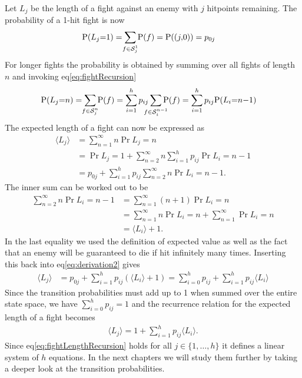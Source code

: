 Let $L_j$ be the length of a fight against an enemy with $j$ hitpoints remaining. The probability of a 1-hit fight is now
\begin{align}\label{eq:probabilityRecursion1hit}
    \Pr{L_j = 1} &= \sum_{\mathclap{f \in \mathcal{S}_j^1}}\Pr{f}
            = \Pr{(j,0}) = p_{0j}
\end{align}
For longer fights the probability is obtained by summing over all fights of length $n$ and invoking eq\ref{eq:fightRecursion}
\begin{align}\label{eq:probabilityRecursion}
    \Pr{L_j = n} &= \sum_{\mathclap{f \in \mathcal{S}_j^n}}\Pr{f}
            = \sum_{i=1}^h p_{ij} \sum_{\mathclap{f \in \mathcal{S}_i^{n-1}}}\Pr{f}
            = \sum_{i=1}^h p_{ij} \Pr{L_i = n-1}
\end{align}
The expected length of a fight can now be expressed as
\begin{align}
	\langle L_j \rangle &= \sum_{n=1}^{\infty}n\Pr{L_j=n}\nonumber\\
       &= \Pr{L_j=1} + \sum_{n=2}^{\infty}n\sum_{i=1}^h p_{ij} \Pr{L_i=n-1}\nonumber\\
       &= p_{0j} + \sum_{i=1}^h p_{ij} \sum_{n=2}^{\infty}n\Pr{L_i=n-1}.\label{eq:derivation2}
\end{align}
The inner sum can be worked out to be
\begin{align}
    \sum_{n=2}^{\infty}n\Pr{L_i=n-1}
       &= \sum_{n=1}^{\infty}(n+1)\Pr{L_i=n} \nonumber\\
	   &= \sum_{n=1}^{\infty}n\Pr{L_i=n} + \sum_{n=1}^{\infty}\Pr{L_i=n}\nonumber\\
	   &= \langle L_i \rangle + 1.
\end{align}
In the last equality we used the definition of expected value as well as the fact that an enemy will be guaranteed to die if hit infinitely many times. Inserting this back into eq\ref{eq:derivation2} gives
\begin{align}
    \langle L_j \rangle
        &= p_{0j} + \sum_{i=1}^h p_{ij}(\langle L_i \rangle+1)
        = \sum_{i=0}^h p_{ij} + \sum_{i=1}^h p_{ij}\langle L_i \rangle
\end{align}
Since the transition probabilities must add up to 1 when summed over the entire state space, we have $\sum_{i=0}^{h}p_{ij} = 1$ and the recurrence relation for the expected length of a fight becomes
\begin{align}
	\boxed{\langle L_j \rangle
		= 1 + \sum_{i=1}^h p_{ij}\langle L_i \rangle}.\label{eq:fightLengthRecursion}
\end{align}
Since eq\ref{eq:fightLengthRecursion} holds for all $j \in \{1,\ldots,h\}$ it defines a linear system of $h$ equations. In the next chapters we will study them further by taking a deeper look at the transition probabilities.
